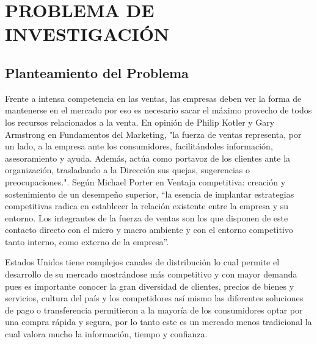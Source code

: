 \newpage

\section{PROBLEMA DE INVESTIGACIÓN}
\subsection{Planteamiento del Problema}



\large 
\doublespacing
Frente a intensa competencia en las ventas, las empresas deben ver la forma de mantenerse en el mercado por eso es necesario sacar el máximo provecho de todos los recursos relacionados a la venta. En opinión de Philip Kotler y Gary Armstrong en Fundamentos del Marketing, "la fuerza de ventas representa, por un lado, a la empresa ante los consumidores, facilitándoles información, asesoramiento y ayuda. Además, actúa como portavoz de los clientes ante la organización, trasladando a la Dirección sus quejas, sugerencias o preocupaciones.". Según Michael Porter en Ventaja competitiva: creación y sostenimiento de un desempeño superior, “la esencia de implantar estrategias competitivas radica en establecer la relación existente entre la empresa y su entorno. Los integrantes de la fuerza de ventas son los que disponen de este contacto directo con el micro y macro ambiente y con el entorno competitivo tanto interno, como externo de la empresa”.




Estados Unidos tiene complejos canales de distribución lo cual permite el desarrollo de su mercado mostrándose más competitivo y con mayor demanda pues es importante conocer la gran diversidad de clientes, precios de bienes y servicios, cultura del país y los competidores así mismo las diferentes soluciones de pago o transferencia permitieron a la mayoría de los consumidores optar por una compra rápida y segura, por lo tanto este es un mercado menos tradicional la cual valora mucho la información, tiempo y confianza.



